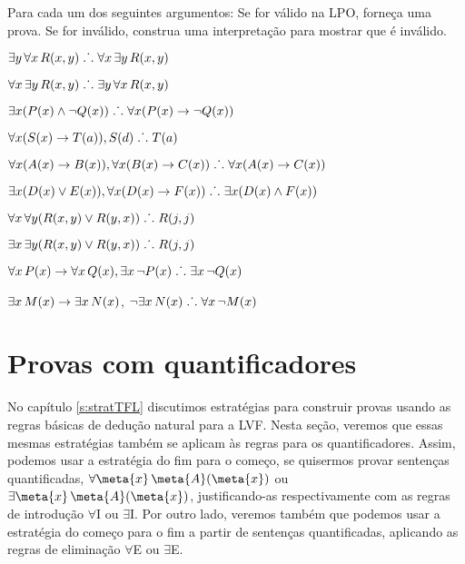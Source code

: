 \solutions
\problempart
\label{pr.FOLvalidornot}
Para cada um dos seguintes argumentos: Se for v\'alido na LPO, forne\c ca uma prova. Se for inv\'alido, construa uma interpreta\c c\~ao para mostrar que \'e inv\'alido.
\begin{earg}
\item $\exists y\,\forall x\,\mathord{R}(x,y) \mathrel{\ldotp\dot{}\,\ldotp} \forall x\,\exists y\,\mathord{R}(x,y)$
\item $\forall x\,\exists y\,\mathord{R}(x,y) \mathrel{\ldotp\dot{}\,\ldotp}  \exists y\,\forall x\,\mathord{R}(x,y)$
\item $\exists x(\mathord{P}(x) \wedge \neg \mathord{Q}(x)) \mathrel{\ldotp\dot{}\,\ldotp} \forall x(\mathord{P}(x) \rightarrow \neg \mathord{Q}(x))$
\item $\forall x(\mathord{S}(x) \rightarrow \mathord{T}(a)), \mathord{S}(d) \mathrel{\ldotp\dot{}\,\ldotp} \mathord{T}(a)$
\item $\forall x(\mathord{A}(x)\rightarrow \mathord{B}(x)), \forall x(\mathord{B}(x) \rightarrow \mathord{C}(x)) \mathrel{\ldotp\dot{}\,\ldotp} \forall x(\mathord{A}(x) \rightarrow \mathord{C}(x))$
\item $\exists x(\mathord{D}(x) \vee \mathord{E}(x)), \forall x(\mathord{D}(x) \rightarrow \mathord{F}(x)) \mathrel{\ldotp\dot{}\,\ldotp} \exists x(\mathord{D}(x) \wedge \mathord{F}(x))$
\item $\forall x\,\forall y(\mathord{R}(x,y) \vee \mathord{R}(y,x)) \mathrel{\ldotp\dot{}\,\ldotp} \mathord{R}(j,j)$
\item $\exists x\,\exists y(\mathord{R}(x,y) \vee \mathord{R}(y,x)) \mathrel{\ldotp\dot{}\,\ldotp} \mathord{R}(j,j)$
\item $\forall x\,\mathord{P}(x) \rightarrow \forall x\,\mathord{Q}(x), \exists x\, \neg\mathord{P}(x) \mathrel{\ldotp\dot{}\,\ldotp} \exists x\, \neg \mathord{Q}(x)$
\item $\exists x\,\mathord{M}(x) \rightarrow \exists x\,\mathord{N}(x)$, $\neg \exists x\,\mathord{N}(x)\mathrel{\ldotp\dot{}\,\ldotp}  \forall x\, \neg \mathord{M}(x)$
\end{earg}


\chapter{Provas com quantificadores}

No cap\'itulo \ref{s:stratTFL}  discutimos estrat\'egias para construir provas usando as regras b\'asicas de dedu\c c\~ao natural para a LVF.  Nesta se\c c\~ao, veremos que essas mesmas estrat\'egias tamb\'em se aplicam \`as regras para os quantificadores. Assim, podemos usar a estrat\'egia do fim para o come\c co, se quisermos provar senten\c cas quantificadas,  $\forall \meta{x}\, \atom{\meta{A}}{\meta{x}}$ ou $\exists \meta{x}\, \atom{\meta{A}}{\meta{x}}$, justificando-as respectivamente com as regras de introdu\c c\~ao $\forall$I ou $\exists$I. Por outro lado, veremos tamb\'em que podemos usar a estrat\'egia do come\c co para o fim a partir de senten\c cas quantificadas, aplicando as regras de elimina\c c\~ao $\forall$E ou $\exists$E.

